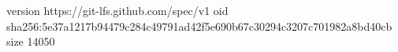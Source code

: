 version https://git-lfs.github.com/spec/v1
oid sha256:5e37a1217b94479c284c49791ad42f5e690b67c30294c3207c701982a8bd40cb
size 14050
